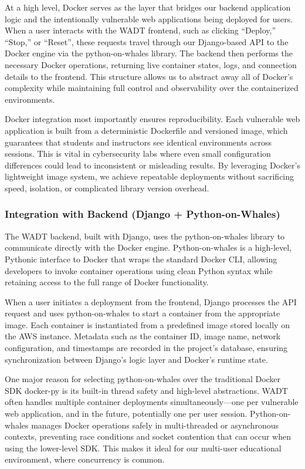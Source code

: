 \documentclass[12pt]{article}
\begin{document}
At a high level, Docker serves as the layer that bridges our backend application logic and the intentionally vulnerable web applications being deployed for users. When a user interacts with the WADT frontend, such as clicking “Deploy,” “Stop,” or “Reset”, these requests travel through our Django-based API to the Docker engine via the python-on-whales library. The backend then performs the necessary Docker operations, returning live container states, logs, and connection details to the frontend. This structure allows us to abstract away all of Docker’s complexity while maintaining full control and observability over the containerized environments.

Docker integration most importantly ensures reproducibility. Each vulnerable web application is built from a deterministic Dockerfile and versioned image, which guarantees that students and instructors see identical environments across sessions. This is vital in cybersecurity labs where even small configuration differences could lead to inconsistent or misleading results. By leveraging Docker’s lightweight image system, we achieve repeatable deployments without sacrificing speed, isolation, or complicated library version overhead.


\subsubsection{Integration with Backend (Django + Python-on-Whales)}
The WADT backend, built with Django, uses the python-on-whales library to communicate directly with the Docker engine. Python-on-whales is a high-level, Pythonic interface to Docker that wraps the standard Docker CLI, allowing developers to invoke container operations using clean Python syntax while retaining access to the full range of Docker functionality. 

When a user initiates a deployment from the frontend, Django processes the API request and uses python-on-whales to start a container from the appropriate image. Each container is instantiated from a predefined image stored locally on the AWS instance. Metadata such as the container ID, image name, network configuration, and timestamps are recorded in the project’s database, ensuring synchronization between Django’s logic layer and Docker’s runtime state.

One major reason for selecting python-on-whales over the traditional Docker SDK docker-py is its built-in thread safety and high-level abstractions. WADT often handles multiple container deployments simultaneously—one per vulnerable web application, and in the future, potentially one per user session. Python-on-whales manages Docker operations safely in multi-threaded or asynchronous contexts, preventing race conditions and socket contention that can occur when using the lower-level SDK. This makes it ideal for our multi-user educational environment, where concurrency is common.
\end{document}

